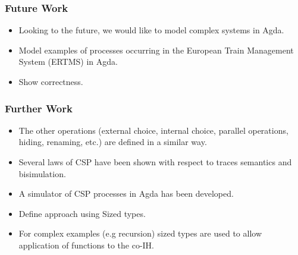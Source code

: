 \documentclass{beamer}
\begin{document}
%
%
%
%
%
%
%
%
%

\begin{frame}[fragile] 
\frametitle{Future Work }

\begin{itemize}
\item Looking to the future, we would like to model complex systems in Agda.
\item Model examples of processes occurring in the European Train Management System (ERTMS) in Agda. 
\item Show correctness. 
\end{itemize}

	

\end{frame}



\begin{frame}[fragile] 
\frametitle{Further Work }


\begin{itemize}


\item The other operations (external choice, internal choice, parallel operations, hiding, renaming, etc.)
are defined in a similar way.

\item  Several laws of CSP have been shown with respect to traces semantics and bisimulation.

\item A simulator of CSP processes in Agda has been developed. 
 

\item Define approach using Sized types.

\item For complex examples (e.g recursion) sized types are used to allow application of functions to the co-IH.
\end{itemize}
\end{frame}
\end{document}

